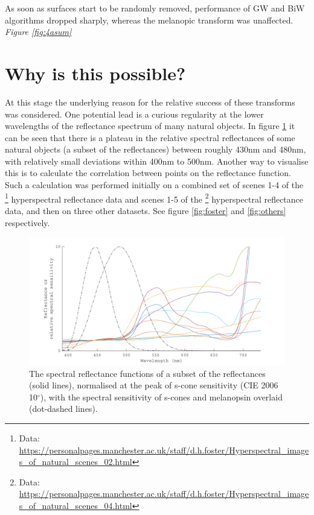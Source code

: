 As soon as surfaces start to be randomly removed, performance of \gls{GW} and \gls{BiW} algorithms dropped sharply, whereas the melanopic transform was unaffected. \emph{Figure \ref{fig:4asum}}


\section{Why is this possible?}


At this stage the underlying reason for the relative success of these transforms was considered. One potential lead is a curious regularity at the lower wavelengths of the reflectance spectrum of many natural objects. In figure \ref{fig:plateau} it can be seen that there is a plateau in the relative spectral reflectances of some natural objects (a subset of the \citet{vrhel_measurement_1994} reflectances) between roughly 430nm and 480nm, with relatively small deviations within 400nm to 500nm. Another way to visualise this is to calculate the correlation between points on the reflectance function. Such a calculation was performed initially on a combined set of scenes 1-4 of the
\citet{nascimento_statistics_2002}\footnote{Data: \url{https://personalpages.manchester.ac.uk/staff/d.h.foster/Hyperspectral_images_of_natural_scenes_02.html}} hyperspectral reflectance data and
scenes 1-5 of the 
\citet{foster_frequency_2006}\footnote{Data: \url{https://personalpages.manchester.ac.uk/staff/d.h.foster/Hyperspectral_images_of_natural_scenes_04.html}}
hyperspectral reflectance data, and then on three other datasets. See figure \ref{fig:foster} and \ref{fig:others} respectively.

\begin{figure}[htbp]
 \includegraphics[max width=\textwidth]{figs/comp/melcomp_2_caller/plateau.pdf}
 \caption{The spectral reflectance functions of a subset of the \citet{vrhel_measurement_1994} reflectances (solid lines), normalised at the peak of s-cone sensitivity (CIE 2006 10$^{\circ}$), with the spectral sensitivity of s-cones and melanopsin \citep{lucas_measuring_2014} overlaid (dot-dashed lines).}
 \label{fig:plateau}
\end{figure} 

